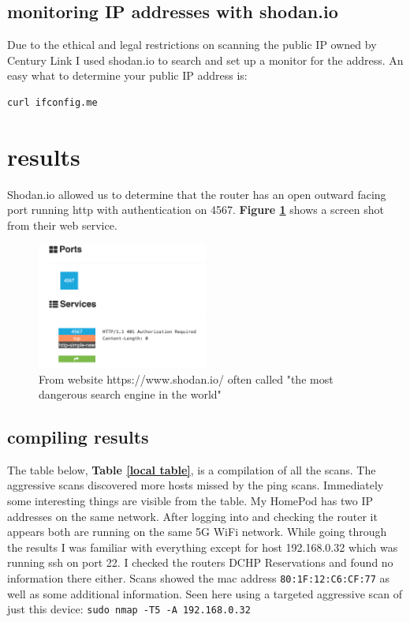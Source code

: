 \documentclass[10pt]{article}
\begin{document}
\subsection*{monitoring IP addresses with shodan.io}
Due to the ethical and legal restrictions on scanning the public IP owned by Century Link I used shodan.io to search and set up a monitor for the address.\cite{shodan}
An easy what to determine your public IP address is:
\begin{verbatim}
curl ifconfig.me
\end{verbatim}

\section*{results}
Shodan.io allowed us to determine that the router has an open outward facing port running http with authentication on 4567.\cite{shodan} \textbf{Figure \ref{shodan image}} 
shows a screen shot from their web service.

\begin{figure}[H]
\centering
\includegraphics[width=0.5\textwidth]{images/shodan.png}
\caption{From website https://www.shodan.io/ often called "the most dangerous search engine in the world"}\label{shodan image}
\end{figure}

\subsection*{compiling results}
The table below, \textbf{Table \ref{local table}}, is a compilation of all the scans. The aggressive scans discovered more hosts missed by the ping scans.
Immediately some interesting things are visible from the table. My HomePod has two IP addresses on the same network. After logging into and checking the router
it appears both are running on the same 5G WiFi network. While going through the results I was familiar with everything except for host 192.168.0.32 which was running ssh
on port 22. I checked the routers DCHP Reservations and found no information there either. Scans showed the mac address \verb|80:1F:12:C6:CF:77| as well as some
additional information. Seen here using a targeted aggressive scan of just this device: \verb|sudo nmap -T5 -A 192.168.0.32| 
\end{document}
